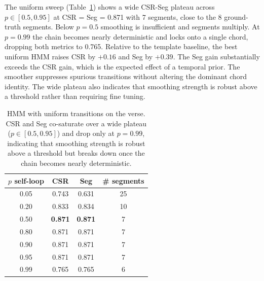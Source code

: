 \documentclass{article}
\begin{document}
The uniform sweep (Table~\ref{tab:hmm-uniform}) shows a wide CSR-Seg plateau across $p \in [0.5, 0.95]$ at CSR = Seg = 0.871 with 7 segments, close to the 8 ground-truth segments. Below $p = 0.5$ smoothing is insufficient and segments multiply. At $p = 0.99$ the chain becomes nearly deterministic and locks onto a single chord, dropping both metrics to 0.765. Relative to the template baseline, the best uniform HMM raises CSR by $+0.16$ and Seg by $+0.39$. The Seg gain substantially exceeds the CSR gain, which is the expected effect of a temporal prior. The smoother suppresses spurious transitions without altering the dominant chord identity. The wide plateau also indicates that smoothing strength is robust above a threshold rather than requiring fine tuning.

\begin{table}[ht]
    \centering
    \caption{HMM with uniform transitions on the verse. CSR and Seg co-saturate over a wide plateau ($p \in [0.5, 0.95]$) and drop only at $p = 0.99$, indicating that smoothing strength is robust above a threshold but breaks down once the chain becomes nearly deterministic.}
    \label{tab:hmm-uniform}
    \begin{tabular}{cccc}
        \toprule
        $p$ self-loop & CSR            & Seg            & \# segments \\
        \midrule
        0.05          & 0.743          & 0.631          & 25          \\
        0.20          & 0.833          & 0.834          & 10          \\
        0.50          & \textbf{0.871} & \textbf{0.871} & 7           \\
        0.80          & 0.871          & 0.871          & 7           \\
        0.90          & 0.871          & 0.871          & 7           \\
        0.95          & 0.871          & 0.871          & 7           \\
        0.99          & 0.765          & 0.765          & 6           \\
        \bottomrule
    \end{tabular}
\end{table}
\end{document}
